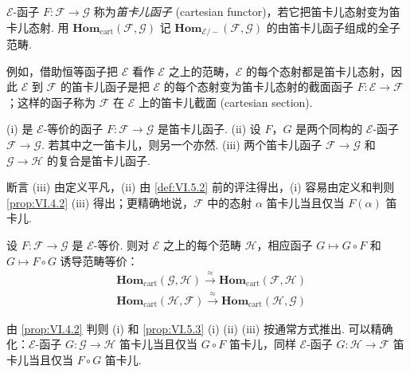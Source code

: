 \begin{definition}\label{def:VI.5.2}
$\mathcal{E}$-函子 $F \colon \mathcal{F} \to \mathcal{G}$ 称为\emph{笛卡儿函子} (cartesian functor)，若它把笛卡儿态射变为笛卡儿态射. 用 $\mathbf{Hom}_{\mathrm{cart}}(\mathcal{F}, \mathcal{G})$ 记 $\mathbf{Hom}_{\mathcal{E}/-}(\mathcal{F}, \mathcal{G})$ 的由笛卡儿函子组成的全子范畴.
\end{definition}

例如，借助恒等函子把 $\mathcal{E}$ 看作 $\mathcal{E}$ 之上的范畴，$\mathcal{E}$ 的每个态射都是笛卡儿态射，因此 $\mathcal{E}$ 到 $\mathcal{F}$ 的笛卡儿函子是把 $\mathcal{E}$ 的每个态射变为笛卡儿态射的截面函子 $F \colon \mathcal{E} \to \mathcal{F}$；这样的函子称为 $\mathcal{F}$ 在 $\mathcal{E}$ 上的笛卡儿截面 (cartesian section).

\begin{proposition}\label{prop:VI.5.3}
(i) 是 $\mathcal{E}$-等价的函子 $F \colon \mathcal{F} \to \mathcal{G}$ 是笛卡儿函子. (ii) 设 $F$，$G$ 是两个同构的 $\mathcal{E}$-函子 $\mathcal{F} \to \mathcal{G}$. 若其中之一笛卡儿，则另一个亦然. (iii) 两个笛卡儿函子 $\mathcal{F} \to \mathcal{G}$ 和 $\mathcal{G} \to \mathcal{H}$ 的复合是笛卡儿函子.
\end{proposition}

断言 (iii) 由定义平凡，(ii) 由 \ref{def:VI.5.2} 前的评注得出，(i) 容易由定义和判则 \ref{prop:VI.4.2} (iii) 得出；更精确地说，$\mathcal{F}$ 中的态射 $\alpha$ 笛卡儿当且仅当 $F(\alpha)$ 笛卡儿.

\begin{corollary}\label{cor:VI.5.4}
设 $F \colon \mathcal{F} \to \mathcal{G}$ 是 $\mathcal{E}$-等价. 则对 $\mathcal{E}$ 之上的每个范畴 $\mathcal{H}$，相应函子 $G \mapsto G \circ F$ 和 $G \mapsto F \circ G$ 诱导范畴等价：
\[
\begin{array}{rl}
& \mathbf{Hom}_{\mathrm{cart}}(\mathcal{G}, \mathcal{H}) \xrightarrow{\approx} \mathbf{Hom}_{\mathrm{cart}}(\mathcal{F}, \mathcal{H}) \\
& \mathbf{Hom}_{\mathrm{cart}}(\mathcal{H}, \mathcal{F}) \xrightarrow{\approx} \mathbf{Hom}_{\mathrm{cart}}(\mathcal{H}, \mathcal{G})
\end{array}
\]
\end{corollary}

由 \ref{prop:VI.4.2} 判则 (i) 和 \ref{prop:VI.5.3} (i) (ii) (iii) 按通常方式推出. 可以精确化：$\mathcal{E}$-函子 $G \colon \mathcal{G} \to \mathcal{H}$ 笛卡儿当且仅当 $G \circ F$ 笛卡儿，同样 $\mathcal{E}$-函子 $G \colon \mathcal{H} \to \mathcal{F}$ 笛卡儿当且仅当 $F \circ G$ 笛卡儿.

